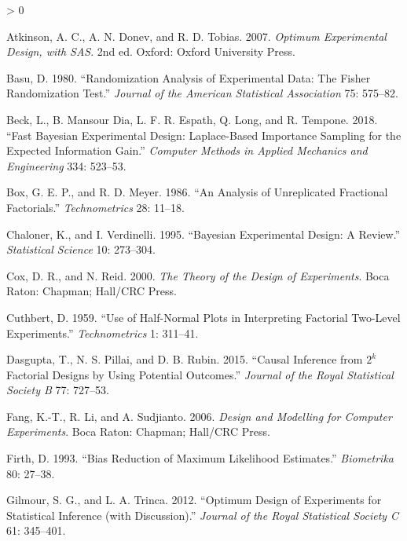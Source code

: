 \documentclass[
  ignorenonframetext,
]{beamer}
\newlength{\cslhangindent}
\newenvironment{CSLReferences}[2] %
 {%
  \setlength{\parindent}{0pt}
  \ifodd #1 \everypar{\setlength{\hangindent}{\cslhangindent}}\ignorespaces\fi
  \ifnum #2 > 0
  \setlength{\parskip}{#2\baselineskip}
  \fi
 }%
 {}
\begin{document}
\begin{frame}{}
\protect\hypertarget{section-62}{}
\hypertarget{refs}{}
\begin{CSLReferences}{1}{0}
\leavevmode\hypertarget{ref-ADT2007}{}%
Atkinson, A. C., A. N. Donev, and R. D. Tobias. 2007. \emph{Optimum
Experimental Design, with SAS}. 2nd ed. Oxford: Oxford University Press.

\leavevmode\hypertarget{ref-Basu1980}{}%
Basu, D. 1980. {``Randomization Analysis of Experimental Data: The
{F}isher Randomization Test.''} \emph{Journal of the American
Statistical Association} 75: 575--82.

\leavevmode\hypertarget{ref-BMELT2018}{}%
Beck, L., B. Mansour Dia, L. F. R. Espath, Q. Long, and R. Tempone.
2018. {``Fast {B}ayesian Experimental Design: {L}aplace-Based Importance
Sampling for the Expected Information Gain.''} \emph{Computer Methods in
Applied Mechanics and Engineering} 334: 523--53.

\leavevmode\hypertarget{ref-BM1986}{}%
Box, G. E. P., and R. D. Meyer. 1986. {``An Analysis of Unreplicated
Fractional Factorials.''} \emph{Technometrics} 28: 11--18.

\leavevmode\hypertarget{ref-CV1995}{}%
Chaloner, K., and I. Verdinelli. 1995. {``Bayesian Experimental Design:
A Review.''} \emph{Statistical Science} 10: 273--304.

\leavevmode\hypertarget{ref-CR2000}{}%
Cox, D. R., and N. Reid. 2000. \emph{The Theory of the Design of
Experiments}. Boca Raton: Chapman; Hall/CRC Press.

\leavevmode\hypertarget{ref-Cuthbert1959}{}%
Cuthbert, D. 1959. {``Use of Half-Normal Plots in Interpreting Factorial
Two-Level Experiments.''} \emph{Technometrics} 1: 311--41.

\leavevmode\hypertarget{ref-DPR2015}{}%
Dasgupta, T., N. S. Pillai, and D. B. Rubin. 2015. {``Causal Inference
from \(2^k\) Factorial Designs by Using Potential Outcomes.''}
\emph{Journal of the Royal Statistical Society B} 77: 727--53.

\leavevmode\hypertarget{ref-FLS2006}{}%
Fang, K.-T., R. Li, and A. Sudjianto. 2006. \emph{Design and Modelling
for Computer Experiments}. Boca Raton: Chapman; Hall/CRC Press.

\leavevmode\hypertarget{ref-Firth1993}{}%
Firth, D. 1993. {``Bias Reduction of Maximum Likelihood Estimates.''}
\emph{Biometrika} 80: 27--38.

\leavevmode\hypertarget{ref-GT2012}{}%
Gilmour, S. G., and L. A. Trinca. 2012. {``Optimum Design of Experiments
for Statistical Inference (with Discussion).''} \emph{Journal of the
Royal Statistical Society C} 61: 345--401.


\end{CSLReferences}
\end{frame}
\end{document}
